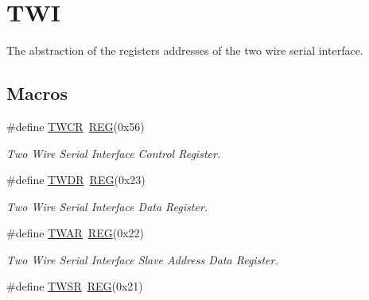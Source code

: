 \hypertarget{group__TWIMCAL}{\section{T\+W\+I}
\label{group__TWIMCAL}
}


The abstraction of the registers addresses of the two wire serial interface.  


\subsection*{Macros}
\begin{DoxyCompactItemize}
\item 
\hypertarget{group__TWIMCAL_ga8a8f8d32669273889071eda20a2b05ae}{\#define \hyperlink{group__TWIMCAL_ga8a8f8d32669273889071eda20a2b05ae}{T\+W\+C\+R}~\hyperlink{group__MCAL_ga72e45020e46f285689db51c46f273403}{R\+E\+G}(0x56)}\label{group__TWIMCAL_ga8a8f8d32669273889071eda20a2b05ae}

\begin{DoxyCompactList}\small\item\em Two Wire Serial Interface Control Register. \end{DoxyCompactList}\item 
\hypertarget{group__TWIMCAL_ga738468621cc8a971ac0ba9ac0c74cd25}{\#define \hyperlink{group__TWIMCAL_ga738468621cc8a971ac0ba9ac0c74cd25}{T\+W\+D\+R}~\hyperlink{group__MCAL_ga72e45020e46f285689db51c46f273403}{R\+E\+G}(0x23)}\label{group__TWIMCAL_ga738468621cc8a971ac0ba9ac0c74cd25}

\begin{DoxyCompactList}\small\item\em Two Wire Serial Interface Data Register. \end{DoxyCompactList}\item 
\hypertarget{group__TWIMCAL_ga0a927e19b601b4fef3573c30956d3172}{\#define \hyperlink{group__TWIMCAL_ga0a927e19b601b4fef3573c30956d3172}{T\+W\+A\+R}~\hyperlink{group__MCAL_ga72e45020e46f285689db51c46f273403}{R\+E\+G}(0x22)}\label{group__TWIMCAL_ga0a927e19b601b4fef3573c30956d3172}

\begin{DoxyCompactList}\small\item\em Two Wire Serial Interface Slave Address Data Register. \end{DoxyCompactList}\item 
\hypertarget{group__TWIMCAL_ga4e34a44ef42cfd27f38c27f64170aa89}{\#define \hyperlink{group__TWIMCAL_ga4e34a44ef42cfd27f38c27f64170aa89}{T\+W\+S\+R}~\hyperlink{group__MCAL_ga72e45020e46f285689db51c46f273403}{R\+E\+G}(0x21)}\label{group__TWIMCAL_ga4e34a44ef42cfd27f38c27f64170aa89}


\end{DoxyCompactItemize}
